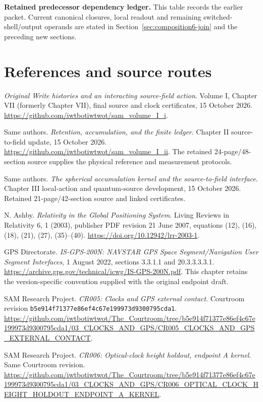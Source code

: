 \documentclass[10pt,twocolumn,letterpaper]{article}
\begin{document}

\clearpage\onecolumn
\par\noindent\textbf{Retained predecessor dependency ledger.} This table records the earlier packet. Current canonical closures, local readout and remaining switched-shell/output operands are stated in Section~\ref{sec:composition6-join} and the preceding new sections.\par

\clearpage\twocolumn
\section*{References and source routes}
\begingroup\footnotesize\raggedright
\noindent[1] \emph{Original Write histories and an interacting source-field action}. Volume I, Chapter VII (formerly Chapter VII), final source and clock certificates, 15 October 2026. \url{https://github.com/iwtbotiwtwot/sam_volume_I_i}.

\noindent[2] Same authors. \emph{Retention, accumulation, and the finite ledger}. Chapter II source-to-field update, 15 October 2026. \url{https://github.com/iwtbotiwtwot/sam_volume_I_ii}. The retained 24-page/48-section source supplies the physical reference and measurement protocols.

\noindent[3] Same authors. \emph{The spherical accumulation kernel and the source-to-field interface}. Chapter III local-action and quantum-source development, 15 October 2026. Retained 21-page/42-section source and linked certificates.

\noindent[4] N. Ashby. \emph{Relativity in the Global Positioning System}. Living Reviews in Relativity 6, 1 (2003), publisher PDF revision 21 June 2007, equations (12), (16), (18), (21), (27), (35)--(40). \url{https://doi.org/10.12942/lrr-2003-1}.

\noindent[5] GPS Directorate. \emph{IS-GPS-200N: NAVSTAR GPS Space Segment/Navigation User Segment Interfaces}, 1 August 2022, sections 3.3.1.1 and 20.3.3.3.3.1. \url{https://archive.gps.gov/technical/icwg/IS-GPS-200N.pdf}. This chapter retains the version-specific convention supplied with the original endpoint draft.

\noindent[6] SAM Research Project. \emph{CR005: Clocks and GPS external contact}. Courtroom revision \nolinkurl{b5e914f71377e86ef4c67e199973d9300795cda1}. \url{https://github.com/iwtbotiwtwot/The_Courtroom/tree/b5e914f71377e86ef4c67e199973d9300795cda1/03_CLOCKS_AND_GPS/CR005_CLOCKS_AND_GPS_EXTERNAL_CONTACT}.

\noindent[7] SAM Research Project. \emph{CR006: Optical-clock height holdout, endpoint A kernel}. Same Courtroom revision. \url{https://github.com/iwtbotiwtwot/The_Courtroom/tree/b5e914f71377e86ef4c67e199973d9300795cda1/03_CLOCKS_AND_GPS/CR006_OPTICAL_CLOCK_HEIGHT_HOLDOUT_ENDPOINT_A_KERNEL}.
\end{document}
